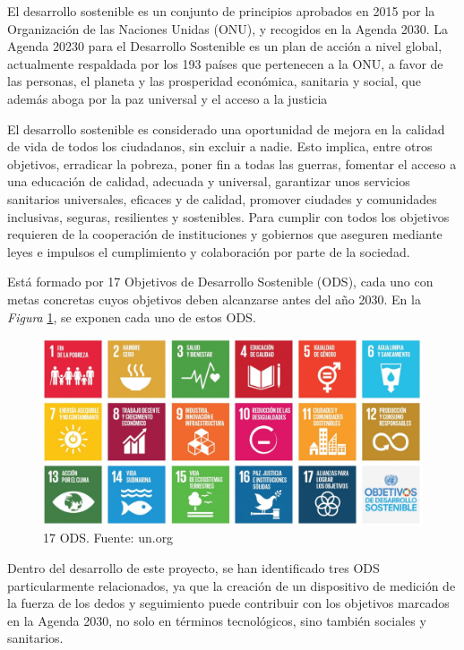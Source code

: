 
El desarrollo sostenible es un conjunto de principios aprobados en 2015 por la Organización de las Naciones Unidas (ONU), y recogidos en la Agenda 2030. La Agenda 20230 para el Desarrollo Sostenible es un plan de acción a nivel global, actualmente respaldada por los 193 países que pertenecen a la ONU, a favor de las personas, el planeta y las prosperidad económica, sanitaria y social, que además aboga por la paz universal y el acceso a la justicia\cite{Agenda2030_gobierno}

El desarrollo sostenible es considerado una oportunidad de mejora en la calidad de vida de todos los ciudadanos, sin excluir a nadie. Esto implica, entre otros objetivos, erradicar la pobreza, poner fin a todas las guerras, fomentar el acceso a una educación de calidad, adecuada y universal, garantizar unos servicios sanitarios universales, eficaces y de calidad, promover ciudades y comunidades inclusivas, seguras, resilientes y sostenibles. Para cumplir con todos los objetivos requieren de la cooperación de instituciones y gobiernos que aseguren mediante leyes e impulsos el cumplimiento y colaboración por parte de la sociedad.\cite{ODS}

Está formado por 17 Objetivos de Desarrollo Sostenible (ODS), cada uno con metas concretas cuyos objetivos deben alcanzarse antes del año 2030. En la \textit{Figura} \ref{fig:ODS}, se exponen cada uno de estos ODS.

\begin{figure}
\centering
\includegraphics[width=1\linewidth]{img/ODS.png}
\caption{17 ODS. Fuente: un.org}
\label{fig:ODS}
\end{figure}

Dentro del desarrollo de este proyecto, se han identificado tres ODS particularmente relacionados, ya que la creación de un dispositivo de medición de la fuerza de los dedos y seguimiento puede contribuir con los objetivos marcados en la Agenda 2030, no solo en términos tecnológicos, sino también sociales y sanitarios.


